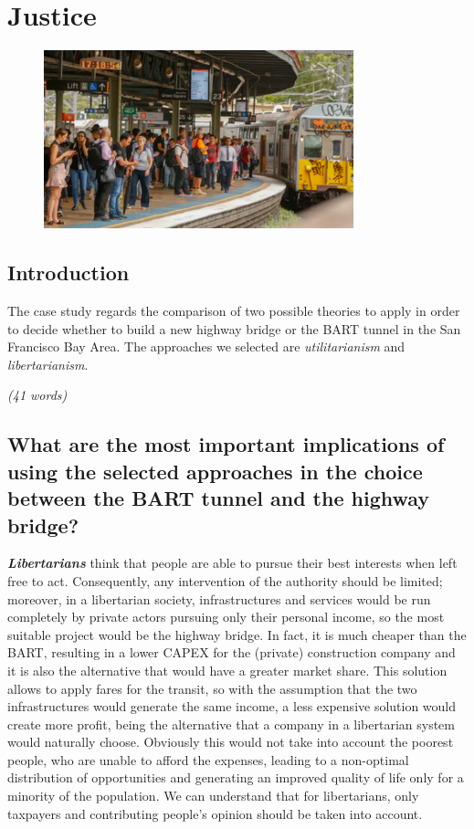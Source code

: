 \chapter{Justice}
\begin{figure}[h]
\centering
\includegraphics[width=0.8\textwidth]{Capitoli_Report/3.1_Justice.png}
\caption{\cite{picjustice}}
\label{fig:justice}
\end{figure}
\newpage
\section{Introduction}
The case study regards the comparison of two possible theories to apply in order to decide whether to build a new highway bridge or the BART tunnel in the San Francisco Bay Area. The approaches we selected are \textit{utilitarianism} and \textit{libertarianism}.

\emph{(41 words)}

\section{What are the most important implications of using the selected approaches in the choice between the BART tunnel and the highway bridge?}

{\em{\bfseries Libertarians}} think that people are able to pursue their best interests when left free to act. Consequently, any intervention of the authority should be limited; moreover, in a libertarian society, infrastructures and services would be run completely by private actors pursuing only their personal income, so the most suitable project would be the highway bridge. In fact, it is much cheaper than the BART, resulting in a lower CAPEX for the (private) construction company and it is also the alternative that would have a greater market share. This solution allows to apply fares for the transit, so with the assumption that the two infrastructures would generate the same income, a less expensive solution would create more profit, being the alternative that a company in a libertarian system would naturally choose. Obviously this would not take into account the poorest people, who are unable to afford the expenses, leading to a non-optimal distribution of opportunities and generating an improved quality of life only for a minority of the population. We can understand that for libertarians, only taxpayers and contributing people’s opinion should be taken into account. 

